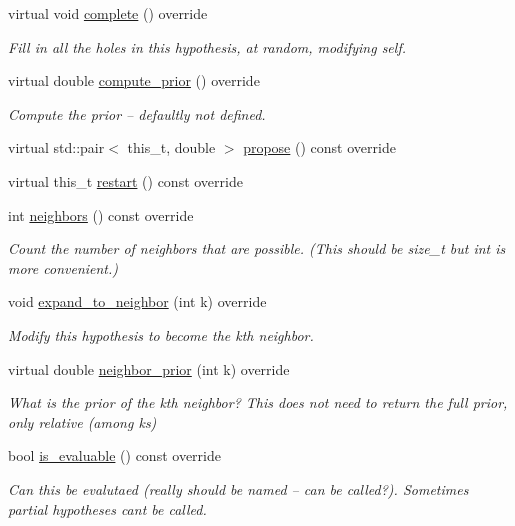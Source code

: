 \begin{DoxyCompactItemize}
\item 
virtual void \hyperlink{class_lexicon_a881ff3280b54f56b88d2511e319b5a4d}{complete} () override
\begin{DoxyCompactList}\small\item\em Fill in all the holes in this hypothesis, at random, modifying self. \end{DoxyCompactList}\item 
virtual double \hyperlink{class_lexicon_a73e4205ac7b0e6f4f207e5d71dea1910}{compute\+\_\+prior} () override
\begin{DoxyCompactList}\small\item\em Compute the prior -- defaultly not defined. \end{DoxyCompactList}\item 
virtual std\+::pair$<$ this\+\_\+t, double $>$ \hyperlink{class_lexicon_a55ee8238cd46ef0ffcefe46ba9af47e2}{propose} () const override
\item 
virtual this\+\_\+t \hyperlink{class_lexicon_af78f84c26c2b3593c505388a45ba6d19}{restart} () const override
\item 
int \hyperlink{class_lexicon_ae6f2b66da71145d0e8983951513b994c}{neighbors} () const override
\begin{DoxyCompactList}\small\item\em Count the number of neighbors that are possible. (This should be size\+\_\+t but int is more convenient.) \end{DoxyCompactList}\item 
void \hyperlink{class_lexicon_a283893cb37705bd6421fb3a1dc94432f}{expand\+\_\+to\+\_\+neighbor} (int k) override
\begin{DoxyCompactList}\small\item\em Modify this hypothesis to become the k\textquotesingle{}th neighbor. \end{DoxyCompactList}\item 
virtual double \hyperlink{class_lexicon_ac4cb2e1a2db91e0aa8984aa5aaad70a9}{neighbor\+\_\+prior} (int k) override
\begin{DoxyCompactList}\small\item\em What is the prior of the k\textquotesingle{}th neighbor? This does not need to return the full prior, only relative (among ks) \end{DoxyCompactList}\item 
bool \hyperlink{class_lexicon_a7742f252ea9909f12071b5af500310cf}{is\+\_\+evaluable} () const override
\begin{DoxyCompactList}\small\item\em Can this be evalutaed (really should be named -- can be called?). Sometimes partial hypotheses can\textquotesingle{}t be called. \end{DoxyCompactList}\item 

\end{DoxyCompactItemize}
